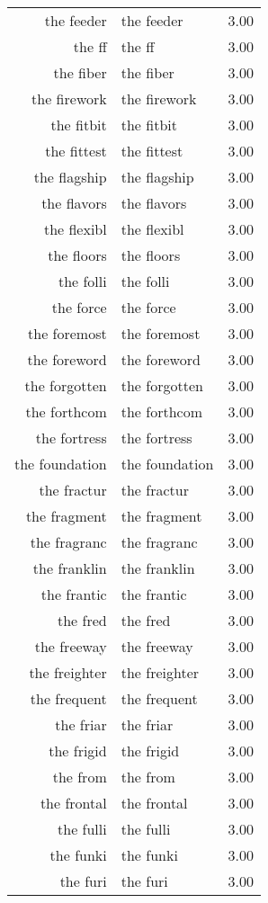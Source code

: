\begin{table}[ht]
\begin{tabular}{rlr}
  the feeder & the feeder & 3.00 \\ 
  the ff & the ff & 3.00 \\ 
  the fiber & the fiber & 3.00 \\ 
  the firework & the firework & 3.00 \\ 
  the fitbit & the fitbit & 3.00 \\ 
  the fittest & the fittest & 3.00 \\ 
  the flagship & the flagship & 3.00 \\ 
  the flavors & the flavors & 3.00 \\ 
  the flexibl & the flexibl & 3.00 \\ 
  the floors & the floors & 3.00 \\ 
  the folli & the folli & 3.00 \\ 
  the force & the force & 3.00 \\ 
  the foremost & the foremost & 3.00 \\ 
  the foreword & the foreword & 3.00 \\ 
  the forgotten & the forgotten & 3.00 \\ 
  the forthcom & the forthcom & 3.00 \\ 
  the fortress & the fortress & 3.00 \\ 
  the foundation & the foundation & 3.00 \\ 
  the fractur & the fractur & 3.00 \\ 
  the fragment & the fragment & 3.00 \\ 
  the fragranc & the fragranc & 3.00 \\ 
  the franklin & the franklin & 3.00 \\ 
  the frantic & the frantic & 3.00 \\ 
  the fred & the fred & 3.00 \\ 
  the freeway & the freeway & 3.00 \\ 
  the freighter & the freighter & 3.00 \\ 
  the frequent & the frequent & 3.00 \\ 
  the friar & the friar & 3.00 \\ 
  the frigid & the frigid & 3.00 \\ 
  the from & the from & 3.00 \\ 
  the frontal & the frontal & 3.00 \\ 
  the fulli & the fulli & 3.00 \\ 
  the funki & the funki & 3.00 \\ 
  the furi & the furi & 3.00 \\ 

\end{tabular}
\end{table}
